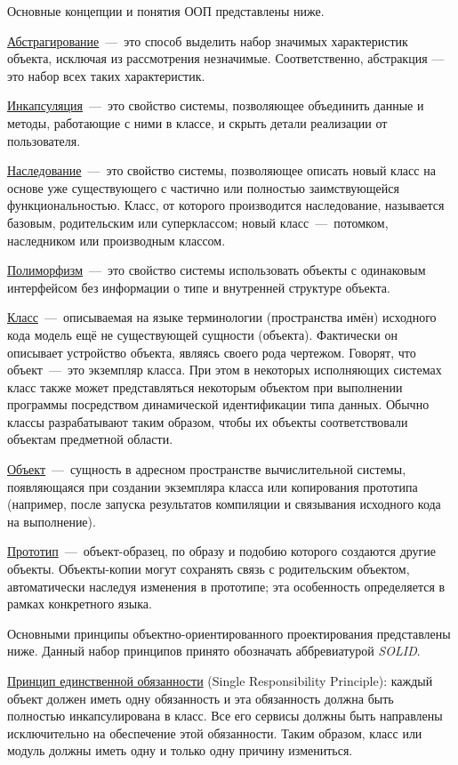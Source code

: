Основные концепции и понятия ООП представлены ниже.

\uline{Абстрагирование}~---~это способ выделить набор значимых характеристик объекта, исключая из рассмотрения незначимые. Соответственно, абстракция — это набор всех таких характеристик.

\uline{Инкапсуляция}~---~это свойство системы, позволяющее объединить данные и методы, работающие с ними в классе, и скрыть детали реализации от пользователя.

\uline{Наследование}~---~это свойство системы, позволяющее описать новый класс на основе уже существующего с частично или полностью заимствующейся функциональностью. Класс, от которого производится наследование, называется базовым, родительским или суперклассом; новый класс~---~потомком, наследником или производным классом.

\uline{Полиморфизм}~---~это свойство системы использовать объекты с одинаковым интерфейсом без информации о типе и внутренней структуре объекта.

\uline{Класс}~---~описываемая на языке терминологии (пространства имён) исходного кода модель ещё не существующей сущности (объекта). Фактически он описывает устройство объекта, являясь своего рода чертежом. Говорят, что объект~---~это экземпляр класса. При этом в некоторых исполняющих системах класс также может представляться некоторым объектом при выполнении программы посредством динамической идентификации типа данных. Обычно классы разрабатывают таким образом, чтобы их объекты соответствовали объектам предметной области.

\uline{Объект}~---~сущность в адресном пространстве вычислительной системы, появляющаяся при создании экземпляра класса или копирования прототипа (например, после запуска результатов компиляции и связывания исходного кода на выполнение).

\uline{Прототип}~---~объект-образец, по образу и подобию которого создаются другие объекты. Объекты-копии могут сохранять связь с родительским объектом, автоматически наследуя изменения в прототипе; эта особенность определяется в рамках конкретного языка.~\cite{PaisonOOP}

Основными принципы объектно-ориентированного проектирования представлены ниже. Данный набор принципов принято обозначать аббревиатурой \textit{SOLID}.

\uline{Принцип единственной обязанности} (Single Responsibility Principle): каждый объект должен иметь одну обязанность и эта обязанность должна быть полностью инкапсулирована в класс. Все его сервисы должны быть направлены исключительно на обеспечение этой обязанности. Таким образом, класс или модуль должны иметь одну и только одну причину измениться.

